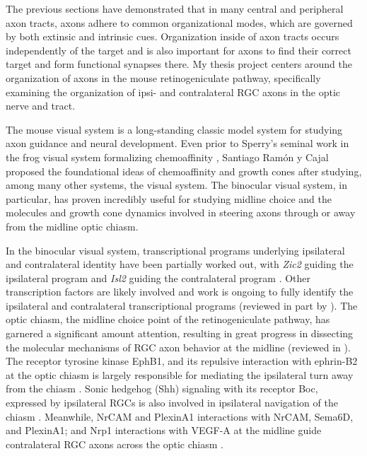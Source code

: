 The previous sections have demonstrated that in many central and peripheral axon tracts, axons adhere to common organizational modes, which are governed by both extinsic and intrinsic cues.
Organization inside of axon tracts occurs independently of the target and is also important for axons to find their correct target and form functional synapses there.
My thesis project centers around the organization of axons in the mouse retinogeniculate pathway, specifically examining the organization of ipsi- and contralateral RGC axons in the optic nerve and tract.

The mouse visual system is a long-standing classic model system for studying axon guidance and neural development.
Even prior to Sperry's seminal work in the frog visual system formalizing chemoaffinity \cite{sperry1963chemoaffinity}, Santiago Ram\'on y Cajal proposed the foundational ideas of chemoaffinity and growth cones after studying, among many other systems, the visual system.
The binocular visual system, in particular, has proven incredibly useful for studying midline choice and the molecules and growth cone dynamics involved in steering axons through or away from the midline optic chiasm.

In the binocular visual system, transcriptional programs underlying ipsilateral and contralateral identity have been partially worked out, with \emph{Zic2} guiding the ipsilateral program and \emph{Isl2} guiding the contralateral program \cite{herrera2003zic2,garcia2008zic2,pak2004magnitude}.
Other transcription factors are likely involved and work is ongoing to fully identify the ipsilateral and contralateral transcriptional programs (reviewed in part by ).
The optic chiasm, the midline choice point of the retinogeniculate pathway, has garnered a significant amount attention, resulting in great progress in dissecting the molecular mechanisms of RGC axon behavior at the midline (reviewed in ).
The receptor tyrosine kinase EphB1, and its repulsive interaction with ephrin-B2 at the optic chiasm is largely responsible for mediating the ipsilateral turn away from the chiasm \cite{nakagawa2000ephrin,williams2003ephrin,petros2009specificity}.
Sonic hedgehog (Shh) signaling with its receptor Boc, expressed by ipsilateral RGCs is also involved in ipsilateral navigation of the chiasm \cite{fabre2010segregation}.
Meanwhile, NrCAM and PlexinA1 interactions with NrCAM, Sema6D, and PlexinA1; and Nrp1 interactions with VEGF-A at the midline guide contralateral RGC axons across the optic chiasm \cite{williams2006role,kuwajima2012optic,erskine2011vegf}.

